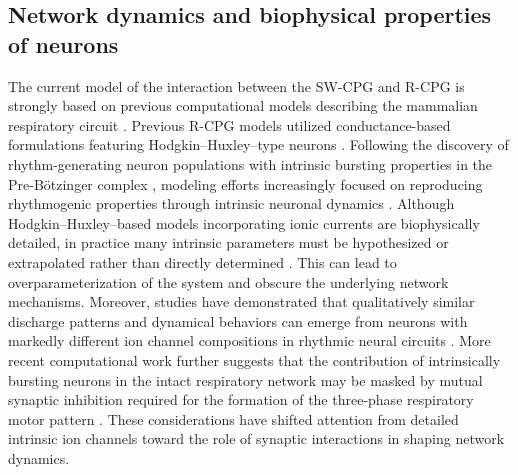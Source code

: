 \documentclass[pdflatex,sn-mathphys-ay]{sn-jnl}%
\theoremstyle{thmstyleone}%
\theoremstyle{thmstyletwo}%
\theoremstyle{thmstylethree}%
\begin{document}
\subsection{Network dynamics and biophysical properties of neurons}
The current model of the interaction between the SW-CPG and R-CPG is strongly based on previous computational models describing the mammalian respiratory circuit \citep{molkov2017computational}. Previous R-CPG models utilized conductance-based formulations featuring Hodgkin–Huxley–type neurons \citep{smith2007spatial, molkov2013control, rybak2004modeling, rubin2009multiple, molkov2014closed}. Following the discovery of rhythm-generating neuron populations with intrinsic bursting properties in the Pre-Bötzinger complex \citep{smith1991pre}, modeling efforts increasingly focused on reproducing rhythmogenic properties through intrinsic neuronal dynamics \cite{butera1999models, ptak2005sodium}.
Although Hodgkin–Huxley–based models incorporating ionic currents are biophysically detailed, in practice many intrinsic parameters must be hypothesized or extrapolated rather than directly determined \cite{del2018breathing}. This can lead to overparameterization of the system and obscure the underlying network mechanisms. Moreover, studies have demonstrated that qualitatively similar discharge patterns and dynamical behaviors can emerge from neurons with markedly different ion channel compositions in rhythmic neural circuits \citep{schulz2006variable, marder2007understanding, goaillard2009functional, marder2015robust}. More recent computational work further suggests that the contribution of intrinsically bursting neurons in the intact respiratory network may be masked by mutual synaptic inhibition required for the formation of the three-phase respiratory motor pattern \citep{rubin2019robustness, wang2020complex, tolmachev2018modeling, guerrier2015robust}. These considerations have shifted attention from detailed intrinsic ion channels toward the role of synaptic interactions in shaping network dynamics.
\end{document}
